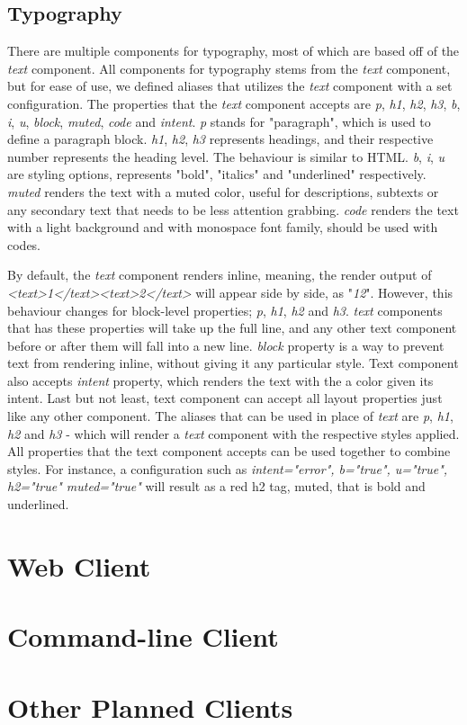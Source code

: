 \subsection{Typography}

There are multiple components for typography, most of which are based off of the \textit{text} component. All components for typography stems from the \textit{text} component, but for ease of use, we defined aliases that utilizes the \textit{text} component with a set configuration. The properties that the \textit{text} component accepts are \textit{p}, \textit{h1}, \textit{h2}, \textit{h3}, \textit{b}, \textit{i}, \textit{u}, \textit{block}, \textit{muted}, \textit{code} and \textit{intent}. \textit{p} stands for "paragraph", which is used to define a paragraph block. \textit{h1}, \textit{h2}, \textit{h3} represents headings, and their respective number represents the heading level. The behaviour is similar to HTML. \textit{b}, \textit{i}, \textit{u} are styling options, represents "bold", "italics" and "underlined" respectively. \textit{muted} renders the text with a muted color, useful for descriptions, subtexts or any secondary text that needs to be less attention grabbing. \textit{code} renders the text with a light background and with monospace font family, should be used with codes. 

By default, the \textit{text} component renders inline, meaning, the render output of \textit{<text>1</text><text>2</text>} will appear side by side, as "\textit{12}". However, this behaviour changes for block-level properties; \textit{p}, \textit{h1}, \textit{h2} and \textit{h3}. \textit{text} components that has these properties will take up the full line, and any other text component before or after them will fall into a new line. \textit{block} property is a way to prevent text from rendering inline, without giving it any particular style. Text component also accepts \textit{intent} property, which renders the text with the a color given its intent. Last but not least, text component can accept all layout properties just like any other component. The aliases that can be used in place of \textit{text} are \textit{p}, \textit{h1}, \textit{h2} and \textit{h3} - which will render a \textit{text} component with the respective styles applied. All properties that the text component accepts can be used together to combine styles. For instance, a configuration such as \textit{intent="error", b="true", u="true", h2="true" muted="true"} will result as a red h2 tag, muted, that is bold and underlined.

\section{Web Client}

\section{Command-line Client}

\section{Other Planned Clients}